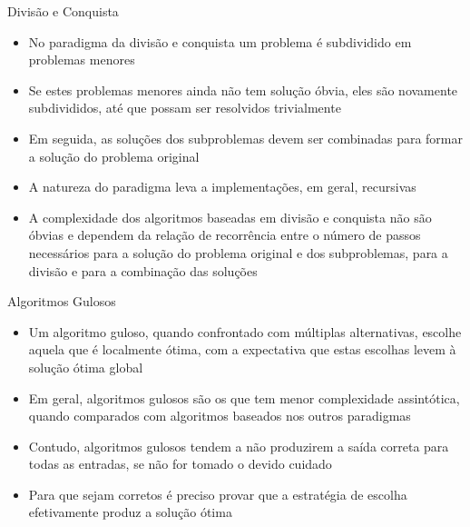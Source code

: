 \begin{frame}[fragile]{Divisão e Conquista}

    \begin{itemize}
        \item No paradigma da divisão e conquista um problema é subdividido em problemas menores

        \item Se estes problemas menores ainda não tem solução óbvia, eles são novamente
            subdivididos, até que possam ser resolvidos trivialmente

        \item Em seguida, as soluções dos subproblemas devem ser combinadas para formar a solução
            do problema original

        \item A natureza do paradigma leva a implementações, em geral, recursivas

        \item A complexidade dos algoritmos baseadas em divisão e conquista não são óbvias e 
            dependem da relação de recorrência entre o número de passos necessários para a solução
            do problema original e dos subproblemas, para a divisão e para a combinação das soluções
    \end{itemize}

\end{frame}

\begin{frame}[fragile]{Algoritmos Gulosos}

    \begin{itemize}
        \item Um algoritmo guloso, quando confrontado com múltiplas alternativas, escolhe aquela
            que é localmente ótima, com a expectativa que estas escolhas levem à solução ótima
            global

        \item Em geral, algoritmos gulosos são os que tem menor complexidade assintótica, quando
            comparados com algoritmos baseados nos outros paradigmas

        \item Contudo, algoritmos gulosos tendem a não produzirem a saída correta para todas as
            entradas, se não for tomado o devido cuidado

        \item Para que sejam corretos é preciso provar que a estratégia de escolha efetivamente
            produz a solução ótima
    \end{itemize}

\end{frame}

